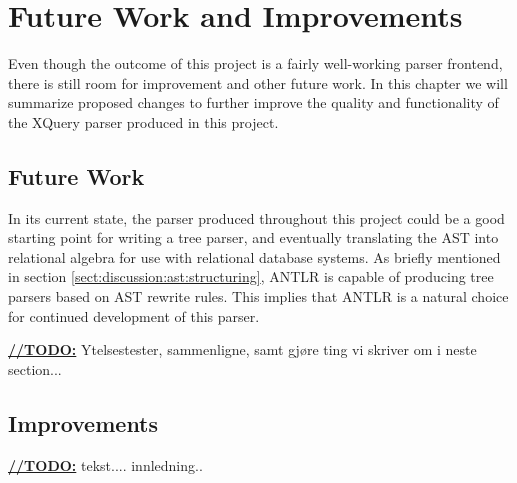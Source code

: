 \chapter{Future Work and Improvements}
\label{sect:summary:future_work}
Even though the outcome of this project is a fairly well-working parser
frontend, there is still room for improvement and other future work. In this
chapter we will summarize proposed changes to further improve the quality and
functionality of the XQuery parser produced in this project.

\section{Future Work}
In its current state, the parser produced throughout this project could be a good
starting point for writing a tree parser, and eventually translating the AST
into relational algebra for use with relational database systems. As briefly
mentioned in section \ref{sect:discussion:ast:structuring}, ANTLR is capable of
producing tree parsers based on AST rewrite rules. This implies that ANTLR is a
natural choice for continued development of this parser.

\underline{\textbf{\LARGE //TODO:}} Ytelsestester, sammenligne, samt gj\o re
ting vi skriver om i neste section... 

\section{Improvements}
\label{sect:future:improvements}
\underline{\textbf{\LARGE //TODO:}} tekst.... innledning..

